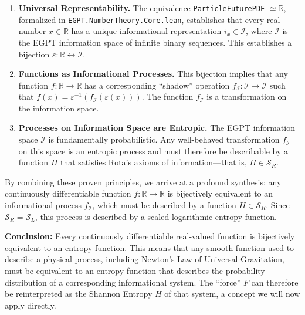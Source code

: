 \documentclass[11pt, letterpaper]{article}
\begin{document}
\begin{enumerate}
    \item \textbf{Universal Representability.} The equivalence \texttt{ParticleFuturePDF} $\simeq \mathbb{R}$, formalized in \texttt{EGPT.NumberTheory.Core.lean}, establishes that every real number $x \in \mathbb{R}$ has a unique informational representation $i_x \in \mathcal{I}$, where $\mathcal{I}$ is the EGPT information space of infinite binary sequences. This establishes a bijection $\varepsilon: \mathbb{R} \leftrightarrow \mathcal{I}$.

    \item \textbf{Functions as Informational Processes.} This bijection implies that any function $f: \mathbb{R} \to \mathbb{R}$ has a corresponding ``shadow'' operation $f_{\mathcal{I}}: \mathcal{I} \to \mathcal{I}$ such that $f(x) = \varepsilon^{-1}(f_{\mathcal{I}}(\varepsilon(x)))$. The function $f_{\mathcal{I}}$ is a transformation on the information space.

    \item \textbf{Processes on Information Space are Entropic.} The EGPT information space $\mathcal{I}$ is fundamentally probabilistic. Any well-behaved transformation $f_{\mathcal{I}}$ on this space is an entropic process and must therefore be describable by a function $H$ that satisfies Rota's axioms of information---that is, $H \in \mathcal{S}_R$.
\end{enumerate}

By combining these proven principles, we arrive at a profound synthesis: any continuously differentiable function $f: \mathbb{R} \to \mathbb{R}$ is bijectively equivalent to an informational process $f_{\mathcal{I}}$, which must be described by a function $H \in \mathcal{S}_R$. Since $\mathcal{S}_R = \mathcal{S}_L$, this process is described by a scaled logarithmic entropy function.

\textbf{Conclusion:} Every continuously differentiable real-valued function is bijectively equivalent to an entropy function. This means that any smooth function used to describe a physical process, including Newton's Law of Universal Gravitation, must be equivalent to an entropy function that describes the probability distribution of a corresponding informational system. The ``force'' $F$ can therefore be reinterpreted as the Shannon Entropy $H$ of that system, a concept we will now apply directly.

\end{document}
